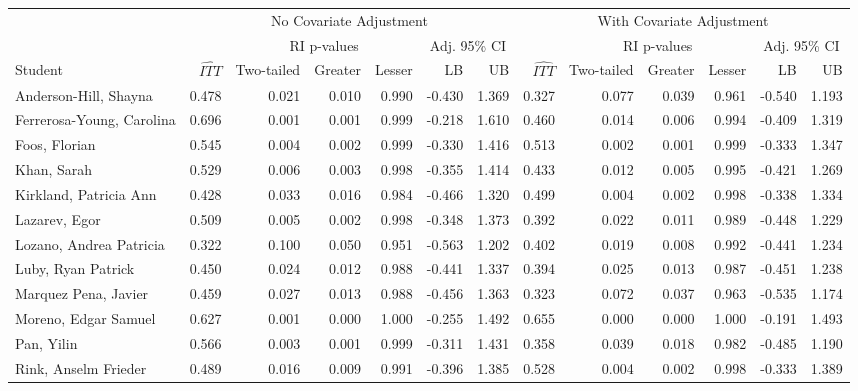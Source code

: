 \documentclass[11pt,notitlepage]{article}
\begin{document}
\begin{table}[h!]\footnotesize\doublespacing
\begin{center}
\begin{tabular}{lrrrrrr|rrrrrr}
  \hline
  & \multicolumn{6}{c|}{No Covariate Adjustment} & \multicolumn{6}{c}{With Covariate Adjustment} \\
  \cline{2-13}
  & & \multicolumn{3}{c}{RI p-values} & \multicolumn{2}{c|}{Adj. 95\% CI} &  & \multicolumn{3}{c}{RI p-values} & \multicolumn{2}{c}{Adj. 95\% CI} \\
  \cline{3-5}\cline{9-11}
Student & $\widehat{ITT}$ & Two-tailed & Greater & Lesser & LB & UB & $\widehat{ITT}$ & Two-tailed & Greater & Lesser & LB & UB \\ 
  \hline
Anderson-Hill, Shayna & 0.478 & 0.021 & 0.010 & 0.990 & -0.430 & 1.369 & 0.327 & 0.077 & 0.039 & 0.961 & -0.540 & 1.193 \\ 
  Ferrerosa-Young, Carolina & 0.696 & 0.001 & 0.001 & 0.999 & -0.218 & 1.610 & 0.460 & 0.014 & 0.006 & 0.994 & -0.409 & 1.319 \\ 
  Foos, Florian & 0.545 & 0.004 & 0.002 & 0.999 & -0.330 & 1.416 & 0.513 & 0.002 & 0.001 & 0.999 & -0.333 & 1.347 \\ 
  Khan, Sarah & 0.529 & 0.006 & 0.003 & 0.998 & -0.355 & 1.414 & 0.433 & 0.012 & 0.005 & 0.995 & -0.421 & 1.269 \\ 
  Kirkland, Patricia Ann & 0.428 & 0.033 & 0.016 & 0.984 & -0.466 & 1.320 & 0.499 & 0.004 & 0.002 & 0.998 & -0.338 & 1.334 \\ 
  Lazarev, Egor & 0.509 & 0.005 & 0.002 & 0.998 & -0.348 & 1.373 & 0.392 & 0.022 & 0.011 & 0.989 & -0.448 & 1.229 \\ 
  Lozano, Andrea Patricia & 0.322 & 0.100 & 0.050 & 0.951 & -0.563 & 1.202 & 0.402 & 0.019 & 0.008 & 0.992 & -0.441 & 1.234 \\ 
  Luby, Ryan Patrick & 0.450 & 0.024 & 0.012 & 0.988 & -0.441 & 1.337 & 0.394 & 0.025 & 0.013 & 0.987 & -0.451 & 1.238 \\ 
  Marquez Pena, Javier & 0.459 & 0.027 & 0.013 & 0.988 & -0.456 & 1.363 & 0.323 & 0.072 & 0.037 & 0.963 & -0.535 & 1.174 \\ 
  Moreno, Edgar Samuel & 0.627 & 0.001 & 0.000 & 1.000 & -0.255 & 1.492 & 0.655 & 0.000 & 0.000 & 1.000 & -0.191 & 1.493 \\ 
  Pan, Yilin & 0.566 & 0.003 & 0.001 & 0.999 & -0.311 & 1.431 & 0.358 & 0.039 & 0.018 & 0.982 & -0.485 & 1.190 \\ 
  Rink, Anselm Frieder & 0.489 & 0.016 & 0.009 & 0.991 & -0.396 & 1.385 & 0.528 & 0.004 & 0.002 & 0.998 & -0.333 & 1.389 \\ 

\end{tabular}
\end{center}
\end{table}
\end{document}
